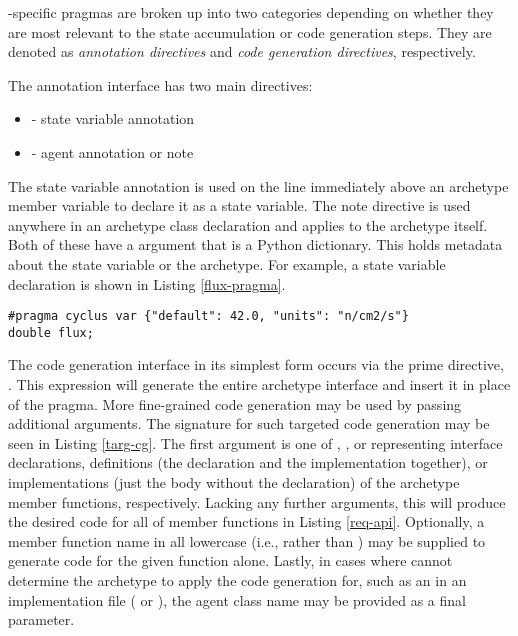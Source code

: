 \cyclus-specific pragmas are broken up into two categories depending on whether 
they are most relevant to the state accumulation or code generation steps. They 
are denoted as \emph{annotation directives} and \emph{code generation directives},
respectively.

The \cycpp annotation interface has two main directives:
\begin{itemize}
    \item {} - state variable annotation
    \item {} - agent annotation or note
\end{itemize}
The state variable annotation is used on the line immediately above an archetype
member variable to declare it as a state variable. The note directive is used
anywhere in an archetype class declaration and applies to the archetype itself.
Both of these have a  argument that is a Python dictionary. This 
holds metadata about the state variable or the archetype. For example, a 
state variable declaration is shown in Listing \ref{flux-pragma}.

\begin{lstlisting}[caption={Flux State Variable Annotation}, label=flux-pragma]
#pragma cyclus var {"default": 42.0, "units": "n/cm2/s"}
double flux;
\end{lstlisting}

The code generation interface in its simplest form occurs via the \cyclus 
prime directive, .  This expression will 
generate the entire archetype interface and insert it in place of the pragma.
More fine-grained code generation may be used by passing additional arguments.
The signature for such targeted code generation may be seen in Listing \ref{targ-cg}.
The first argument is one of , , or  representing 
interface declarations, definitions (the declaration and the implementation together), 
or implementations (just the body without the declaration) of the archetype member
functions, respectively. Lacking any further arguments, this will produce the desired code for 
all of member functions in Listing \ref{req-api}.  Optionally, a member function 
name in all lowercase (i.e.,  rather than ) may 
be supplied to generate code for the given function alone.  Lastly, in 
cases where \cycpp cannot determine the archetype to apply the code generation for,
such as an in an implementation file ( or ), the agent
class name may be provided as a final parameter.

